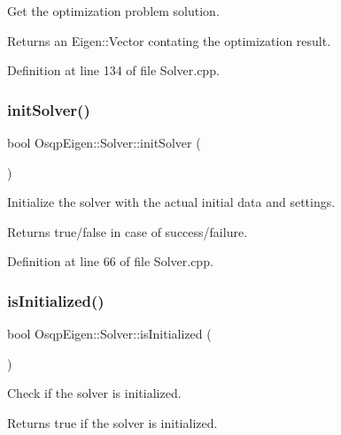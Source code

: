Get the optimization problem solution. 

\begin{DoxyReturn}{Returns}
an Eigen\+::\+Vector contating the optimization result. 
\end{DoxyReturn}


Definition at line 134 of file Solver.\+cpp.

\mbox{\label{classOsqpEigen_1_1Solver_a8487090a685d7653ea4011971c2f21f7}} 
\subsubsection{\texorpdfstring{init\+Solver()}{initSolver()}}
{\footnotesize\ttfamily bool Osqp\+Eigen\+::\+Solver\+::init\+Solver (\begin{DoxyParamCaption}{ }\end{DoxyParamCaption})}



Initialize the solver with the actual initial data and settings. 

\begin{DoxyReturn}{Returns}
true/false in case of success/failure. 
\end{DoxyReturn}


Definition at line 66 of file Solver.\+cpp.

\mbox{\label{classOsqpEigen_1_1Solver_a05c8a18a9d9ed9a74fc0dc26af711348}} 
\subsubsection{\texorpdfstring{is\+Initialized()}{isInitialized()}}
{\footnotesize\ttfamily bool Osqp\+Eigen\+::\+Solver\+::is\+Initialized (\begin{DoxyParamCaption}{ }\end{DoxyParamCaption})}



Check if the solver is initialized. 

\begin{DoxyReturn}{Returns}
true if the solver is initialized. 
\end{DoxyReturn}


